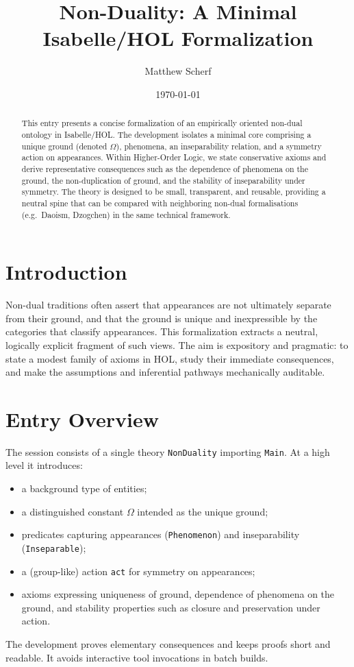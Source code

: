 \documentclass[11pt,a4paper]{article}
\title{Non-Duality: A Minimal Isabelle/HOL Formalization}
\author{Matthew Scherf}
\date{\today}
\begin{document}
\maketitle

\begin{abstract}
This entry presents a concise formalization of an empirically oriented
non-dual ontology in Isabelle/HOL. The development isolates a minimal core
comprising a unique ground (denoted \(\Omega\)), phenomena, an inseparability
relation, and a symmetry action on appearances. Within Higher-Order Logic, we
state conservative axioms and derive representative consequences such as the
dependence of phenomena on the ground, the non-duplication of ground, and the
stability of inseparability under symmetry. The theory is designed to be small,
transparent, and reusable, providing a neutral spine that can be compared with
neighboring non-dual formalisations (e.g.\ Daoism, Dzogchen) in the same
technical framework.
\end{abstract}

\tableofcontents
\bigskip

\section{Introduction}

Non-dual traditions often assert that appearances are not ultimately separate
from their ground, and that the ground is unique and inexpressible by the
categories that classify appearances. This formalization extracts a neutral,
logically explicit fragment of such views. The aim is expository and pragmatic:
to state a modest family of axioms in HOL, study their immediate consequences,
and make the assumptions and inferential pathways mechanically auditable.

\section{Entry Overview}

The session consists of a single theory \texttt{NonDuality} importing
\texttt{Main}. At a high level it introduces:
\begin{itemize}
  \item a background type of entities;
  \item a distinguished constant \(\Omega\) intended as the unique ground;
  \item predicates capturing appearances (\texttt{Phenomenon}) and
        inseparability (\texttt{Inseparable});
  \item a (group-like) action \texttt{act} for symmetry on appearances;
  \item axioms expressing uniqueness of ground, dependence of phenomena on the
        ground, and stability properties such as closure and preservation under
        action.
\end{itemize}
The development proves elementary consequences and keeps proofs short and
readable. It avoids interactive tool invocations in batch builds.
\end{document}
